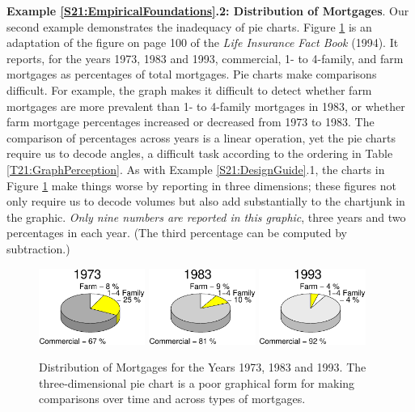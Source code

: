 \linejed

\textbf{Example \ref{S21:EmpiricalFoundations}.2: Distribution of
Mortgages}. Our second example demonstrates the inadequacy of pie
charts. Figure \ref{F21:PieChartsMortgages} is an adaptation of the
figure on page 100 of the \emph{Life Insurance Fact Book} (1994). It
reports, for the years 1973, 1983 and 1993, commercial, 1- to
4-family, and farm mortgages as percentages of total mortgages. Pie
charts make comparisons difficult. For example, the graph makes it
difficult to detect whether farm mortgages are more prevalent than
1- to 4-family mortgages in 1983, or whether farm mortgage
percentages increased or decreased from 1973 to 1983. The comparison
of percentages across years is a linear operation, yet the pie
charts require us to decode angles, a difficult task according to
the ordering in Table \ref{T21:GraphPerception}. As with Example
\ref{S21:DesignGuide}.1, the charts in Figure
\ref{F21:PieChartsMortgages} make things worse by reporting in three
dimensions; these figures not only require us to decode volumes but
also add substantially to the chartjunk in the graphic. \emph{Only
nine numbers are reported in this graphic}, three years and two
percentages in each year. (The third percentage can be computed by
subtraction.)


\begin{figure}[htp]
  \begin{center}
    \includegraphics[width=0.31\textwidth]{Chapter21Graphs/F21Mortgage73.eps}
    \hfill
        \includegraphics[width=0.31\textwidth]{Chapter21Graphs/F21Mortgage83.eps} \hfill
            \includegraphics[width=0.31\textwidth]{Chapter21Graphs/F21Mortgage93.eps}
    \caption{\label{F21:PieChartsMortgages} \small Distribution of Mortgages for the Years 1973, 1983 and
1993. The three-dimensional pie chart is a poor graphical form for
making comparisons over time and across types of mortgages.}

  \end{center}
\end{figure}

